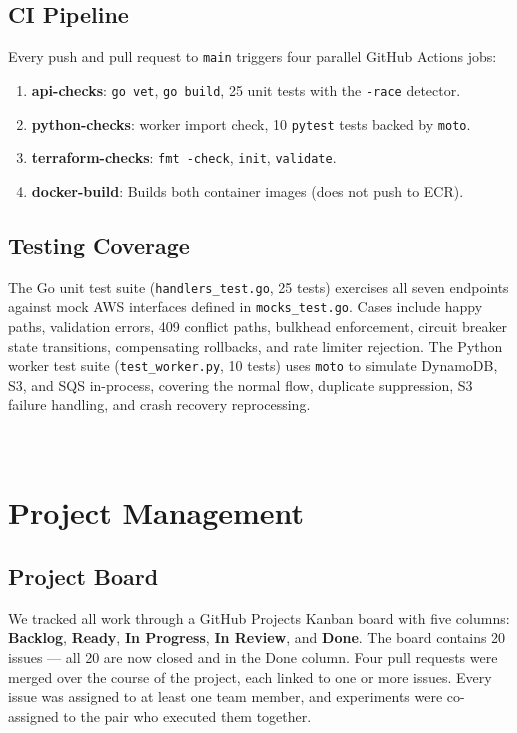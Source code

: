 \documentclass[11pt,letterpaper]{article}
\newcommand{\code}[1]{\texttt{\small #1}}
\begin{document}
\subsection{CI Pipeline}
Every push and pull request to \code{main} triggers four parallel GitHub Actions jobs:
\begin{enumerate}[noitemsep]
  \item \textbf{api-checks}: \code{go vet}, \code{go build}, 25 unit tests with the \code{-race} detector.
  \item \textbf{python-checks}: worker import check, 10 \code{pytest} tests backed by \code{moto}.
  \item \textbf{terraform-checks}: \code{fmt -check}, \code{init}, \code{validate}.
  \item \textbf{docker-build}: Builds both container images (does not push to ECR).
\end{enumerate}

\subsection{Testing Coverage}
The Go unit test suite (\code{handlers\_test.go}, 25 tests) exercises all seven endpoints against mock AWS interfaces defined in \code{mocks\_test.go}. Cases include happy paths, validation errors, 409 conflict paths, bulkhead enforcement, circuit breaker state transitions, compensating rollbacks, and rate limiter rejection. The Python worker test suite (\code{test\_worker.py}, 10 tests) uses \code{moto} to simulate DynamoDB, S3, and SQS in-process, covering the normal flow, duplicate suppression, S3 failure handling, and crash recovery reprocessing. \\ \\ \\


\section{Project Management}
\label{sec:pm}

\subsection{Project Board}
We tracked all work through a GitHub Projects Kanban board with five columns: \textbf{Backlog}, \textbf{Ready}, \textbf{In Progress}, \textbf{In Review}, and \textbf{Done}. The board contains 20 issues --- all 20 are now closed and in the Done column. Four pull requests were merged over the course of the project, each linked to one or more issues. Every issue was assigned to at least one team member, and experiments were co-assigned to the pair who executed them together.
\end{document}
